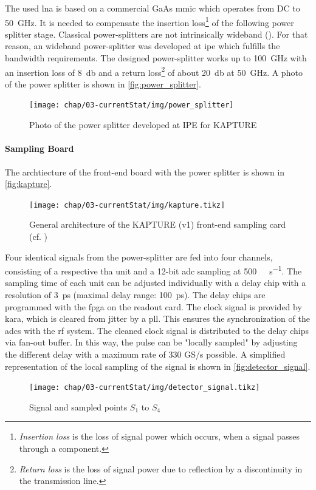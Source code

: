 The used \gls{lna} is based on a commercial GaAs \gls{mmic} which operates from DC to \SI{50}{\giga \hertz}. 
It is needed to compensate the insertion loss\footnote{\textit{Insertion loss} is the loss of signal power which occurs, when a signal passes through a component.} of the following power splitter stage. 
Classical power-splitters are not intrinsically wideband (\cite{caselle2014}). For that reason, an wideband power-splitter was developed at \gls{ipe} which fulfills the bandwidth requirements. 
The designed power-splitter works up to \SI{100}{\giga \hertz} with an insertion loss of \SI{8}{\decibel} and a return loss\footnote{\textit{Return loss} is the loss of signal power due to reflection by a discontinuity in the transmission line.} of about \SI{20}{\decibel} at \SI{50}{\giga \hertz}.\cite{caselle2014}
A photo of the power splitter is shown in \autoref{fig:power_splitter}.

\begin{figure}[tbh]
	\centering
	\texttt{[image: chap/03-currentStat/img/power\_splitter]}
	\caption{Photo of the power splitter developed at IPE for KAPTURE}
	\label{fig:power_splitter}
\end{figure}

\paragraph{Sampling Board}
The archtiecture of the front-end board with the power splitter is shown in \autoref{fig:kapture}. 
\begin{figure}[tbh]
	\centering
	\texttt{[image: chap/03-currentStat/img/kapture.tikz]}
	\caption[General architecture of the KAPTURE system]{General architecture of the KAPTURE (v1) front-end sampling card (cf. \cite[p.2]{caselleKAP})}
	\label{fig:kapture}
\end{figure}

Four identical signals from the power-splitter are fed into four channels, consisting of a respective \gls{tha} unit and a 12-bit \gls{adc} sampling at \SI{500}{\mega\sample\per\second}. 
The sampling time of each unit can be adjusted individually with a delay chip with a resolution of \SI{3}{\pico \second} (maximal delay range: \SI{100}{\pico \second}). 
The delay chips are programmed with the \gls{fpga} on the readout card.
The clock signal is provided by \gls{kara}, which is cleared from jitter by a \gls{pll}. 
This ensures the synchronization of the \glspl{adc} with the \gls{rf} system. 
The cleaned clock signal is distributed to the delay chips via fan-out buffer. \cite{caselleKAP}
In this way, the pulse can be "locally sampled" by adjusting the different delay with a maximum rate of 330 GS/s possible. 
A simplified representation of the local sampling of the signal is shown in \autoref{fig:detector_signal}.
\begin{figure}[tbh]
	\centering
	\texttt{[image: chap/03-currentStat/img/detector\_signal.tikz]}
	\caption{Signal and sampled points $S_1$ to $S_4$}
	\label{fig:detector_signal}
\end{figure}

